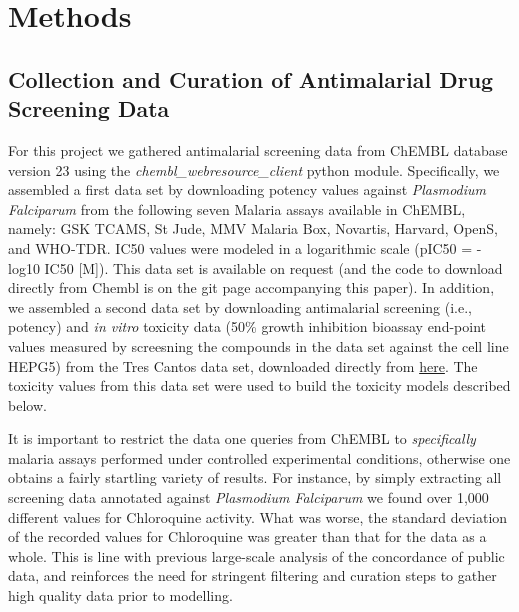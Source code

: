 \documentclass{article}
\begin{document}
\section{Methods}

\subsection{Collection and Curation of Antimalarial Drug Screening Data}

For this project we gathered antimalarial screening data from ChEMBL database version 23 using the {\it chembl\_webresource\_client} python module\cite{Davies2015}.
Specifically, we assembled a first data set by downloading potency values against \textit{Plasmodium Falciparum} from the following seven Malaria assays available in ChEMBL, namely: GSK TCAMS, St Jude, MMV Malaria Box, Novartis, Harvard, OpenS, and WHO-TDR.
IC50 values were modeled in a logarithmic scale (pIC50 = -log10 IC50 [M]). This data set is available on request (and the code to download directly from Chembl is on the git page accompanying this paper).
\newline
\newline
In addition, we assembled a second data set by downloading antimalarial screening (i.e., potency) and {\it in vitro} toxicity data (50\% growth inhibition bioassay end-point values measured by screesning the compounds in the data set against the cell line HEPG5) from the Tres Cantos data set, downloaded directly from \href{https://chembl.gitbook.io/chembl-ntd/downloads/deposited-set-1-gsk-tcams-dataset-20th-may-2010}{here}. The toxicity values from this data set were used to build the toxicity models described below.
\newline
\newline


It is important to restrict the data one queries from ChEMBL to \textit{specifically} malaria assays performed under controlled experimental conditions, otherwise one obtains a fairly startling variety of results. 
For instance, by simply extracting all screening data annotated against 
\textit{Plasmodium Falciparum} we found over 1,000 different values for Chloroquine activity. What was worse, the standard deviation of the recorded values for Chloroquine was greater than that for the data as a whole. This is line with previous large-scale analysis of the concordance of public data\cite{Kalliokoski2013,Kalliokoski2013B,Cortes-Ciriano2015}, and reinforces the need for stringent filtering and curation steps to gather high quality data prior to modelling.
\end{document}
